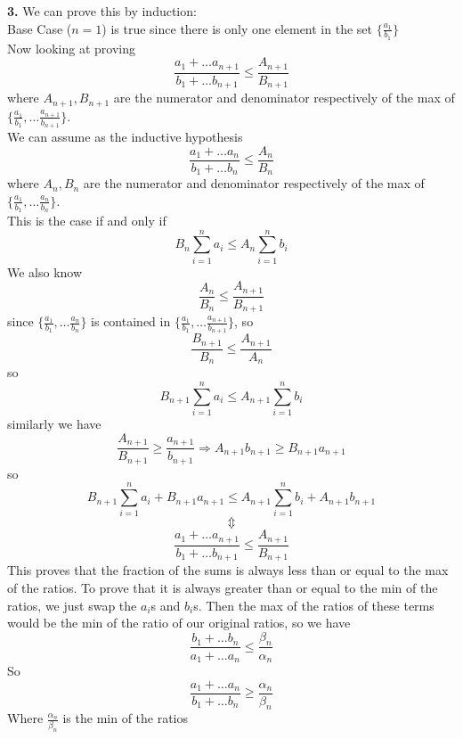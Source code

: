 \documentclass[12pt]{article}
\newenvironment{ques}{\vspace{2 ex}}{\vspace{2 ex}}
\theoremstyle{definition}
\begin{document}
\begin{ques}
	\textbf{3.} 
		We can prove this by induction:\\
		Base Case ($n = 1$) is true since there is only one element in
		the set $\{\frac{a_1}{b_1}\}$\\
		Now looking at proving
		$$\frac{a_1 + \dots a_{n+1}}{b_1 + \dots b_{n+1}} \leq
		\frac{A_{n+1}}{B_{n+1}}$$
		where $A_{n+1}, B_{n+1}$ are the numerator and denominator
		respectively of the max of $\{\frac{a_1}{b_1}, \dots
		\frac{a_{n+1}}{b_{n+1}}\}$.\\ 
		We can assume as the inductive hypothesis 
		$$\frac{a_1 + \dots a_n}{b_1 + \dots b_n} \leq \frac{A_n}{B_n}$$
		where $A_n, B_n$ are the numerator and denominator respectively
		of the max of $\{\frac{a_1}{b_1}, \dots \frac{a_n}{b_n}\}$.\\
		This is the case if and only if
		$$B_n\sum_{i=1}^n a_i \leq A_n \sum_{i=1}^n b_i$$
		We also know
		$$\frac{A_n}{B_n} \leq \frac{A_{n+1}}{B_{n+1}}$$
		since $\{\frac{a_1}{b_1}, \dots \frac{a_n}{b_n}\}$ is contained
		in $\{\frac{a_1}{b_1}, \dots \frac{a_{n+1}}{b_{n+1}}\}$, so
		$$\frac{B_{n+1}}{B_n} \leq \frac{A_{n+1}}{A_{n}}$$
		so
		$$B_{n+1}\sum_{i=1}^n a_i \leq A_{n+1} \sum_{i=1}^n b_i$$
		similarly we have
		$$\frac{A_{n+1}}{B_{n+1}} \geq \frac{a_{n+1}}{b_{n+1}}
		\Rightarrow A_{n+1}b_{n+1} \geq B_{n+1}a_{n+1}$$
		so
		$$B_{n+1}\sum_{i=1}^n a_i +  B_{n+1}a_{n+1} \leq A_{n+1}
		\sum_{i=1}^n b_i + A_{n+1}b_{n+1}$$
		$$\Updownarrow$$
		$$\frac{a_1 + \dots a_{n+1}}{b_1 + \dots b_{n+1}} \leq
		\frac{A_{n+1}}{B_{n+1}}$$
		This proves that the fraction of the sums is always less than or equal to
		the max of the ratios. To prove that it is always greater than
		or equal to the min of the ratios, we just swap the $a_i$s and
		$b_i$s. Then the max of the ratios of these terms would be the
		min of the ratio of our original ratios, so we have
		$$\frac{b_1 + \dots b_{n}}{a_1 + \dots a_{n}} \leq \frac{\beta_n}{\alpha_n}$$ 
		So
		$$\frac{a_1 + \dots a_{n}}{b_1 + \dots b_{n}} \geq \frac{\alpha_n}{\beta_n}$$ 
		Where $\frac{\alpha_n}{\beta_n}$ is the min of the ratios
\end{ques}
\end{document}
